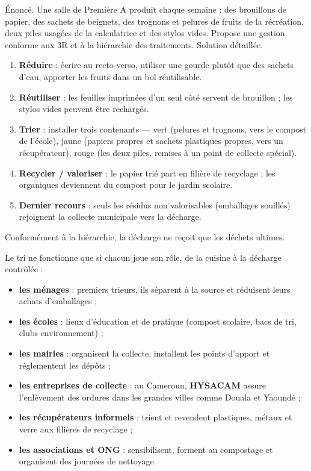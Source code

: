 \documentclass[11pt]{article}
\newcounter{popsec}
\newcounter{popsub}
\newcommand{\courssub}[1]{%
  \stepcounter{popsub}%
  \par\vspace{9pt}\noindent{\popxbold\fontsize{11.5}{13}\selectfont\color{popink}{\color{poporange}\thepopsec.\thepopsub}\hspace{6pt}#1}\par\nopagebreak\vspace{4pt}
}
\begin{document}
\begin{exoresolu}
Énoncé. Une salle de Première A produit chaque semaine : des brouillons de papier, des sachets de beignets, des trognons et pelures de fruits de la récréation, deux piles usagées de la calculatrice et des stylos vides. Propose une gestion conforme aux 3R et à la hiérarchie des traitements.
\tcblower
Solution détaillée.
\begin{enumerate}
\item \textbf{Réduire} : écrire au recto-verso, utiliser une gourde plutôt que des sachets d'eau, apporter les fruits dans un bol réutilisable.
\item \textbf{Réutiliser} : les feuilles imprimées d'un seul côté servent de brouillon ; les stylos vides peuvent être rechargés.
\item \textbf{Trier} : installer trois contenants — vert (pelures et trognons, vers le compost de l'école), jaune (papiers propres et sachets plastiques propres, vers un récupérateur), rouge (les deux piles, remises à un point de collecte spécial).
\item \textbf{Recycler / valoriser} : le papier trié part en filière de recyclage ; les organiques deviennent du compost pour le jardin scolaire.
\item \textbf{Dernier recours} : seuls les résidus non valorisables (emballages souillés) rejoignent la collecte municipale vers la décharge.
\end{enumerate}
Conformément à la hiérarchie, la décharge ne reçoit que les déchets ultimes.
\end{exoresolu}

\courssub{Les acteurs du tri et de la collecte}

Le tri ne fonctionne que si chacun joue son rôle, de la cuisine à la décharge contrôlée :

\begin{itemize}
\item \textbf{les ménages} : premiers trieurs, ils séparent à la source et réduisent leurs achats d'emballages ;
\item \textbf{les écoles} : lieux d'éducation et de pratique (compost scolaire, bacs de tri, clubs environnement) ;
\item \textbf{les mairies} : organisent la collecte, installent les points d'apport et réglementent les dépôts ;
\item \textbf{les entreprises de collecte} : au Cameroun, \textbf{HYSACAM} assure l'enlèvement des ordures dans les grandes villes comme Douala et Yaoundé ;
\item \textbf{les récupérateurs informels} : trient et revendent plastiques, métaux et verre aux filières de recyclage ;
\item \textbf{les associations et ONG} : sensibilisent, forment au compostage et organisent des journées de nettoyage.
\end{itemize}
\end{document}
